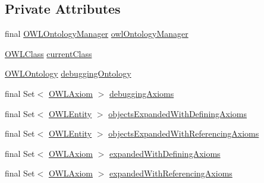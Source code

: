 \subsection*{Private Attributes}
\begin{DoxyCompactItemize}
\item 
final \hyperlink{interfaceorg_1_1semanticweb_1_1owlapi_1_1model_1_1_o_w_l_ontology_manager}{O\-W\-L\-Ontology\-Manager} \hyperlink{classorg_1_1semanticweb_1_1owlapi_1_1debugging_1_1_black_box_o_w_l_debugger_a64c02c68dbf9c247dc497a07a14e7e2e}{owl\-Ontology\-Manager}
\item 
\hyperlink{interfaceorg_1_1semanticweb_1_1owlapi_1_1model_1_1_o_w_l_class}{O\-W\-L\-Class} \hyperlink{classorg_1_1semanticweb_1_1owlapi_1_1debugging_1_1_black_box_o_w_l_debugger_a48f31b8b8d1182eeb522fe9a37374a4d}{current\-Class}
\item 
\hyperlink{interfaceorg_1_1semanticweb_1_1owlapi_1_1model_1_1_o_w_l_ontology}{O\-W\-L\-Ontology} \hyperlink{classorg_1_1semanticweb_1_1owlapi_1_1debugging_1_1_black_box_o_w_l_debugger_ae19a9c14a0977396b38d84c633569208}{debugging\-Ontology}
\item 
final Set$<$ \hyperlink{interfaceorg_1_1semanticweb_1_1owlapi_1_1model_1_1_o_w_l_axiom}{O\-W\-L\-Axiom} $>$ \hyperlink{classorg_1_1semanticweb_1_1owlapi_1_1debugging_1_1_black_box_o_w_l_debugger_a2d7b82ca0f54c02c0e594a4cab7dad9b}{debugging\-Axioms}
\item 
final Set$<$ \hyperlink{interfaceorg_1_1semanticweb_1_1owlapi_1_1model_1_1_o_w_l_entity}{O\-W\-L\-Entity} $>$ \hyperlink{classorg_1_1semanticweb_1_1owlapi_1_1debugging_1_1_black_box_o_w_l_debugger_a8c43fdba2a05cbba27b6855195ca12ff}{objects\-Expanded\-With\-Defining\-Axioms}
\item 
final Set$<$ \hyperlink{interfaceorg_1_1semanticweb_1_1owlapi_1_1model_1_1_o_w_l_entity}{O\-W\-L\-Entity} $>$ \hyperlink{classorg_1_1semanticweb_1_1owlapi_1_1debugging_1_1_black_box_o_w_l_debugger_a2a862d9b165cfbb4e05a466954c4f987}{objects\-Expanded\-With\-Referencing\-Axioms}
\item 
final Set$<$ \hyperlink{interfaceorg_1_1semanticweb_1_1owlapi_1_1model_1_1_o_w_l_axiom}{O\-W\-L\-Axiom} $>$ \hyperlink{classorg_1_1semanticweb_1_1owlapi_1_1debugging_1_1_black_box_o_w_l_debugger_a80cf7a87fb7611aca9cbd2f9c537d3eb}{expanded\-With\-Defining\-Axioms}
\item 
final Set$<$ \hyperlink{interfaceorg_1_1semanticweb_1_1owlapi_1_1model_1_1_o_w_l_axiom}{O\-W\-L\-Axiom} $>$ \hyperlink{classorg_1_1semanticweb_1_1owlapi_1_1debugging_1_1_black_box_o_w_l_debugger_a00807edd35b3752b525d6062601677c5}{expanded\-With\-Referencing\-Axioms}

\end{DoxyCompactItemize}
